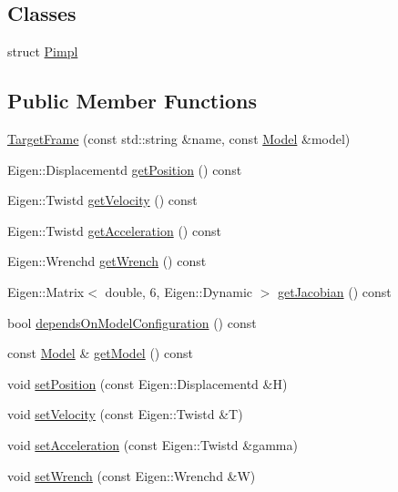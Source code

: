 \subsection*{Classes}
\begin{DoxyCompactItemize}
\item 
struct \hyperlink{structocra_1_1TargetFrame_1_1Pimpl}{Pimpl}
\end{DoxyCompactItemize}
\subsection*{Public Member Functions}
\begin{DoxyCompactItemize}
\item 
\hyperlink{classocra_1_1TargetFrame_ab7cf677c24a55434c4b285127235ae3c}{Target\+Frame} (const std\+::string \&name, const \hyperlink{classocra_1_1Model}{Model} \&model)
\item 
Eigen\+::\+Displacementd \hyperlink{classocra_1_1TargetFrame_aa3b0ea930635f23b208295aaaae73f49}{get\+Position} () const 
\item 
Eigen\+::\+Twistd \hyperlink{classocra_1_1TargetFrame_aece5b69d599c7a0ebe8e473c16da1332}{get\+Velocity} () const 
\item 
Eigen\+::\+Twistd \hyperlink{classocra_1_1TargetFrame_a79f8d33bd65f3fa0abc7749d1bb9c9a9}{get\+Acceleration} () const 
\item 
Eigen\+::\+Wrenchd \hyperlink{classocra_1_1TargetFrame_ac6bc494b492ea77c6655d081f0e69e41}{get\+Wrench} () const 
\item 
Eigen\+::\+Matrix$<$ double, 6, Eigen\+::\+Dynamic $>$ \hyperlink{classocra_1_1TargetFrame_a9cd897fc01e56131fbd6bdbe3c371e80}{get\+Jacobian} () const 
\item 
bool \hyperlink{classocra_1_1TargetFrame_aa0f37eaa093ec9e74924c2444921bf3e}{depends\+On\+Model\+Configuration} () const 
\item 
const \hyperlink{classocra_1_1Model}{Model} \& \hyperlink{classocra_1_1TargetFrame_a13b548f0e6a75b64365e21f5a9d11078}{get\+Model} () const 
\item 
void \hyperlink{classocra_1_1TargetFrame_a760081f3ae88a43ff91dc6a746083286}{set\+Position} (const Eigen\+::\+Displacementd \&H)
\item 
void \hyperlink{classocra_1_1TargetFrame_aff778ddb4526e90b927ec12bda52e8d6}{set\+Velocity} (const Eigen\+::\+Twistd \&T)
\item 
void \hyperlink{classocra_1_1TargetFrame_a3cbbcab6f3179320bd6c6f8c5aeabc75}{set\+Acceleration} (const Eigen\+::\+Twistd \&gamma)
\item 
void \hyperlink{classocra_1_1TargetFrame_a3d8e094de52e69b626322b6cce57d23e}{set\+Wrench} (const Eigen\+::\+Wrenchd \&W)
\end{DoxyCompactItemize}
